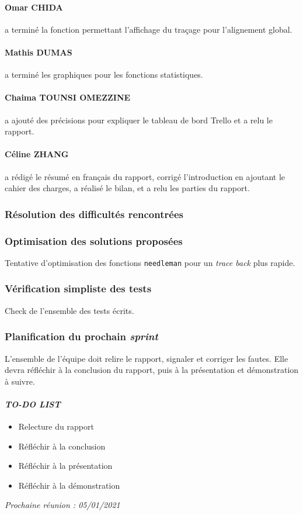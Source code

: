 \paragraph*{Omar CHIDA} a terminé la fonction permettant l'affichage du traçage pour l'alignement global.

\paragraph*{Mathis DUMAS} a terminé les graphiques pour les fonctions statistiques.

\paragraph*{Chaima TOUNSI OMEZZINE} a ajouté des précisions pour expliquer le tableau de bord Trello et a relu le rapport.

\paragraph*{Céline ZHANG} a rédigé le résumé en français du rapport, corrigé l'introduction en ajoutant le cahier des charges, a réalisé le bilan, et a relu les parties du rapport.

\subsubsection*{Résolution des difficultés rencontrées}


\subsubsection*{Optimisation des solutions proposées}
Tentative d'optimisation des fonctions \texttt{needleman} pour un \textsl{trace back} plus rapide.

\subsubsection*{Vérification simpliste des tests}
Check de l'ensemble des tests écrits.

\subsubsection*{Planification du prochain \textsl{sprint}}
L'ensemble de l'équipe doit relire le rapport, signaler et corriger les fautes. Elle devra réfléchir à la conclusion du rapport, puis à la présentation et démonstration à suivre.

\paragraph{\emph{TO-DO LIST}}
\begin{itemize}
    \item Relecture du rapport
    \item Réfléchir à la conclusion
    \item Réfléchir à la présentation
    \item Réfléchir à la démonstration
\end{itemize}

\emph{Prochaine réunion : 05/01/2021}\\

% 